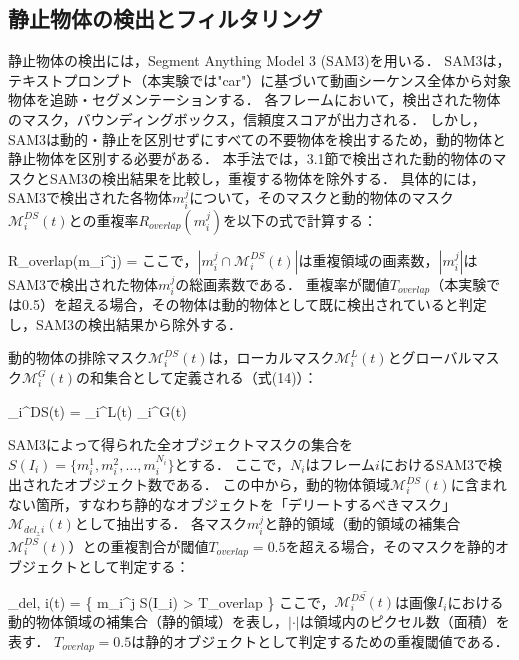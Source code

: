 \documentclass[a4paper,dvipdfmx,ja=standard,9pt]{bxjsarticle}
\let\oldequation\equation
\let\endoldequation\endequation
\renewenvironment{equation}{%
  \oldequation
  \Large  %
}{%
  \endoldequation
}
\begin{document}
\subsection{静止物体の検出とフィルタリング}
静止物体の検出には，Segment Anything Model 3 (SAM3)\cite{carion2025sam3segmentconcepts}を用いる．
SAM3は，テキストプロンプト（本実験では"car"）に基づいて動画シーケンス全体から対象物体を追跡・セグメンテーションする．
各フレームにおいて，検出された物体のマスク，バウンディングボックス，信頼度スコアが出力される．
しかし，SAM3は動的・静止を区別せずにすべての不要物体を検出するため，動的物体と静止物体を区別する必要がある．
本手法では，3.1節で検出された動的物体のマスクとSAM3の検出結果を比較し，重複する物体を除外する．
具体的には，SAM3で検出された各物体$m_i^j$について，そのマスクと動的物体のマスク$\mathcal{M}_i^{DS}(t)$との重複率$R_{overlap}(m_i^j)$を以下の式で計算する：
\begin{equation}
R_{overlap}(m_i^j) = 
\end{equation}
\vspace{-9pt}
ここで，$|m_i^j \cap \mathcal{M}_i^{DS}(t)|$は重複領域の画素数，$|m_i^j|$はSAM3で検出された物体$m_i^j$の総画素数である．
重複率が閾値$T_{overlap}$（本実験では0.5）を超える場合，その物体は動的物体として既に検出されていると判定し，SAM3の検出結果から除外する．

動的物体の排除マスク$\mathcal{M}_i^{DS}(t)$は，ローカルマスク$\mathcal{M}_i^L(t)$とグローバルマスク$\mathcal{M}_i^G(t)$の和集合として定義される（式(14)）：
\begin{equation}
_i^{DS}(t) = _i^L(t) \cup {}_i^G(t)
\end{equation}
\vspace{-9pt}

SAM3によって得られた全オブジェクトマスクの集合を$S(I_i) = \{m_i^1, m_i^2, \ldots, m_i^{N_i}\}$とする．
ここで，$N_i$はフレーム$i$におけるSAM3で検出されたオブジェクト数である．
この中から，動的物体領域$\mathcal{M}_i^{DS}(t)$に含まれない箇所，すなわち静的なオブジェクトを「デリートするべきマスク」$\mathcal{M}_{del, i}(t)$として抽出する．
各マスク$m_i^j$と静的領域（動的領域の補集合$\overline{\mathcal{M}_i^{DS}(t)}$）との重複割合が閾値$T_{overlap} = 0.5$を超える場合，そのマスクを静的オブジェクトとして判定する：
\begin{equation}
_{del, i}(t) = \left\{ m_i^j \in S(I_i) \mid {} > T_{overlap} \right\}
\end{equation}
\vspace{-9pt}
ここで，$\overline{\mathcal{M}_i^{DS}(t)}$は画像$I_i$における動的物体領域の補集合（静的領域）を表し，$|\cdot|$は領域内のピクセル数（面積）を表す．
$T_{overlap} = 0.5$は静的オブジェクトとして判定するための重複閾値である．
\end{document}
